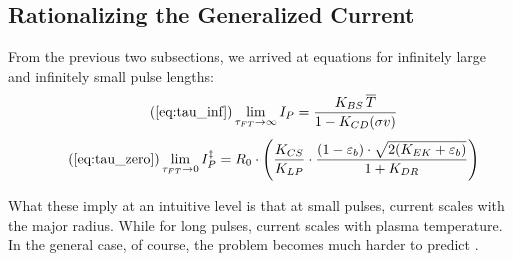 \subsection{Rationalizing the Generalized Current}

From the previous two subsections, we arrived at equations for infinitely large and infinitely small pulse lengths:
\begin{equation}
	\tag{\ref{eq:tau_inf}}
	\lim_{\tau_{FT} \to \infty} I_P = \frac{ K_{BS} \, \overline T }{ 1 - K_{CD} ( \sigma v ) }
\end{equation}
\begin{equation}
	\tag{\ref{eq:tau_zero}}
	\lim_{ \tau_{FT} \to 0 } I_P^\ddagger = R_0 \cdot \left( \frac{ K_{CS} }{ K_{LP} } \cdot \frac{ ( 1 - \varepsilon_b ) \cdot \sqrt{ 2 ( K_{EK} + \varepsilon_b ) } }{ 1 + K_{DR} } \right)
\end{equation}

What these imply at an intuitive level is that at small pulses, current scales with the major radius. While for long pulses, current scales with plasma temperature. In the general case, of course, the problem becomes much harder to predict .

%
